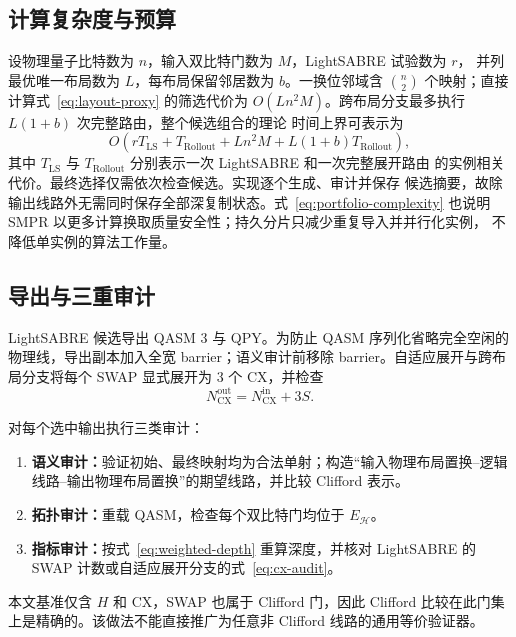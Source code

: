 \documentclass[11pt,a4paper]{article}
\newcommand{\Hardware}{\mathcal H}
\newcommand{\LS}{\mathrm{LS}}
\newcommand{\Rollout}{\mathrm{Rollout}}
\begin{document}
\subsection{计算复杂度与预算}

设物理量子比特数为 $n$，输入双比特门数为 $M$，LightSABRE 试验数为 $r$，
并列最优唯一布局数为 $L$，每布局保留邻居数为 $b$。一换位邻域含
$\binom n2$ 个映射；直接计算式~\eqref{eq:layout-proxy} 的筛选代价为
$O(Ln^2M)$。跨布局分支最多执行 $L(1+b)$ 次完整路由，整个候选组合的理论
时间上界可表示为
\begin{equation}
  O\!\left(rT_{\LS}+T_{\Rollout}
  +Ln^2M+L(1+b)T_{\Rollout}\right),
  \label{eq:portfolio-complexity}
\end{equation}
其中 $T_{\LS}$ 与 $T_{\Rollout}$ 分别表示一次 LightSABRE 和一次完整展开路由
的实例相关代价。最终选择仅需依次检查候选。实现逐个生成、审计并保存
候选摘要，故除输出线路外无需同时保存全部深复制状态。式~\eqref{eq:portfolio-complexity}
也说明 SMPR 以更多计算换取质量安全性；持久分片只减少重复导入并并行化实例，
不降低单实例的算法工作量。

\subsection{导出与三重审计}

LightSABRE 候选导出 QASM 3 与 QPY。为防止 QASM 序列化省略完全空闲的物理线，导出副本加入全宽 barrier；语义审计前移除 barrier。自适应展开与跨布局分支将每个 SWAP 显式展开为 3 个 CX，并检查
\begin{equation}
  N_{\mathrm{CX}}^{\mathrm{out}}
  =N_{\mathrm{CX}}^{\mathrm{in}}+3S.
  \label{eq:cx-audit}
\end{equation}

对每个选中输出执行三类审计：

\begin{enumerate}[label=(\arabic*),itemsep=0.25em]
  \item \textbf{语义审计：}验证初始、最终映射均为合法单射；构造“输入物理布局置换--逻辑线路--输出物理布局置换”的期望线路，并比较 Clifford 表示。
  \item \textbf{拓扑审计：}重载 QASM，检查每个双比特门均位于 $E_{\Hardware}$。
  \item \textbf{指标审计：}按式~\eqref{eq:weighted-depth} 重算深度，并核对 LightSABRE 的 SWAP 计数或自适应展开分支的式~\eqref{eq:cx-audit}。
\end{enumerate}

本文基准仅含 $H$ 和 CX，SWAP 也属于 Clifford 门，因此 Clifford 比较在此门集上是精确的。该做法不能直接推广为任意非 Clifford 线路的通用等价验证器。
\end{document}
